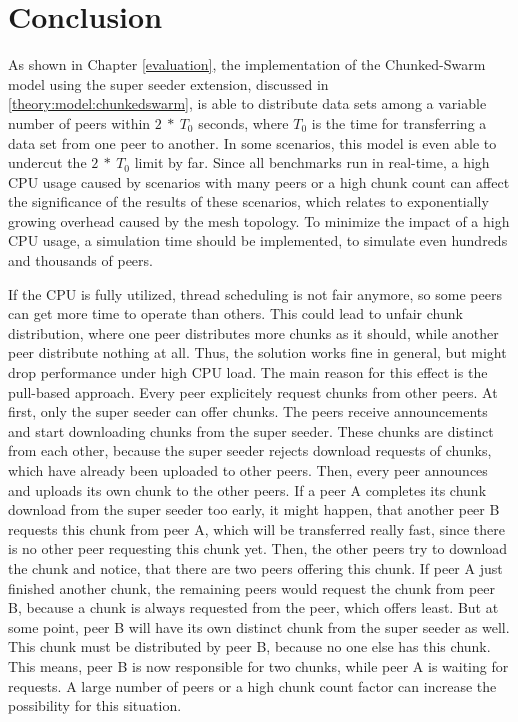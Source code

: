 
\chapter{Conclusion}
\label{conclusion}

As shown in Chapter \ref{evaluation}, the implementation of the Chunked-Swarm model using the super seeder extension, discussed in \ref{theory:model:chunkedswarm}, is able to distribute data sets among a variable number of peers within $2\:*\:T_0$ seconds, where $T_0$ is the time for transferring a data set from one peer to another. In some scenarios, this model is even able to undercut the $2\:*\:T_0$ limit by far. Since all benchmarks run in real-time, a high CPU usage caused by scenarios with many peers or a high chunk count can affect the significance of the results of these scenarios, which relates to exponentially growing overhead caused by the mesh topology. To minimize the impact of a high CPU usage, a simulation time should be implemented, to simulate even hundreds and thousands of peers.

If the CPU is fully utilized, thread scheduling is not fair anymore, so some peers can get more time to operate than others. This could lead to unfair chunk distribution, where one peer distributes more chunks as it should, while another peer distribute nothing at all. Thus, the solution works fine in general, but might drop performance under high CPU load. The main reason for this effect is the pull-based approach. Every peer explicitely request chunks from other peers. At first, only the super seeder can offer chunks. The peers receive announcements and start downloading chunks from the super seeder. These chunks are distinct from each other, because the super seeder rejects download requests of chunks, which have already been uploaded to other peers. Then, every peer announces and uploads its own chunk to the other peers. If a peer A completes its chunk download from the super seeder too early, it might happen, that another peer B requests this chunk from peer A, which will be transferred really fast, since there is no other peer requesting this chunk yet. Then, the other peers try to download the chunk and notice, that there are two peers offering this chunk. If peer A just finished another chunk, the remaining peers would request the chunk from peer B, because a chunk is always requested from the peer, which offers least. But at some point, peer B will have its own distinct chunk from the super seeder as well. This chunk must be distributed by peer B, because no one else has this chunk. This means, peer B is now responsible for two chunks, while peer A is waiting for requests. A large number of peers or a high chunk count factor can increase the possibility for this situation.


